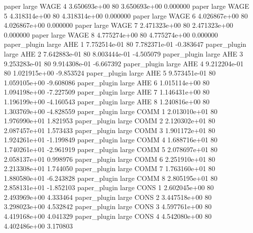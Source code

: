               paper      large     WAGE                 4 3.650693e+00 80   3.650693e+00           0.000000
              paper      large     WAGE                 5 4.318314e+00 80   4.318314e+00           0.000000
              paper      large     WAGE                 6 4.026867e+00 80   4.026867e+00           0.000000
              paper      large     WAGE                 7 2.471323e+00 80   2.471323e+00           0.000000
              paper      large     WAGE                 8 4.775274e+00 80   4.775274e+00           0.000000
       paper_plugin      large      AHE                 1 7.752514e-01 80   7.782371e-01          -0.383647
       paper_plugin      large      AHE                 2 7.642883e-01 80   8.003444e-01          -4.505079
       paper_plugin      large      AHE                 3 9.253283e-01 80   9.914308e-01          -6.667392
       paper_plugin      large      AHE                 4 9.212204e-01 80   1.021915e+00          -9.853524
       paper_plugin      large      AHE                 5 9.573451e-01 80   1.059105e+00          -9.608086
       paper_plugin      large      AHE                 6 1.015114e+00 80   1.094198e+00          -7.227509
       paper_plugin      large      AHE                 7 1.146431e+00 80   1.196199e+00          -4.160543
       paper_plugin      large      AHE                 8 1.240816e+00 80   1.303769e+00          -4.828559
       paper_plugin      large     COMM                 1 2.013010e+01 80   1.976990e+01           1.821953
       paper_plugin      large     COMM                 2 2.120302e+01 80   2.087457e+01           1.573433
       paper_plugin      large     COMM                 3 1.901172e+01 80   1.924261e+01          -1.199849
       paper_plugin      large     COMM                 4 1.688716e+01 80   1.740261e+01          -2.961919
       paper_plugin      large     COMM                 5 2.078697e+01 80   2.058137e+01           0.998976
       paper_plugin      large     COMM                 6 2.251910e+01 80   2.213308e+01           1.744050
       paper_plugin      large     COMM                 7 1.763160e+01 80   1.880580e+01          -6.243828
       paper_plugin      large     COMM                 8 2.805195e+01 80   2.858131e+01          -1.852103
       paper_plugin      large     CONS                 1 2.602045e+00 80   2.493969e+00           4.333464
       paper_plugin      large     CONS                 2 3.447518e+00 80   3.298023e+00           4.532842
       paper_plugin      large     CONS                 3 4.597761e+00 80   4.419168e+00           4.041329
       paper_plugin      large     CONS                 4 4.542080e+00 80   4.402486e+00           3.170803
